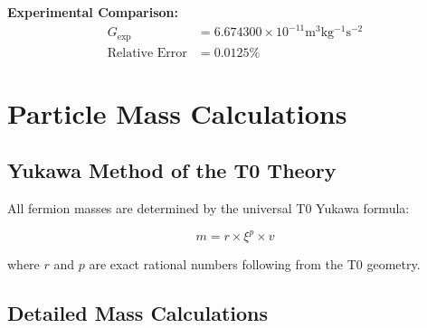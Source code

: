 \documentclass[11pt,a4paper]{article}
\begin{document}
	\textbf{Experimental Comparison:}
	\begin{align}
		G_{\text{exp}} &= 6{.}674300 \times 10^{-11} \si{\meter^3 \kilogram^{-1} \second^{-2}} \\
		\text{Relative Error} &= 0{.}0125\%
	\end{align}
	
	
	\section{Particle Mass Calculations}
	
	\subsection{Yukawa Method of the T0 Theory}
	
	All fermion masses are determined by the universal T0 Yukawa formula:
	
	\begin{equation}
		\boxed{m = r \times \xi^p \times v}
	\end{equation}
	
	where $r$ and $p$ are exact rational numbers following from the T0 geometry.
	
	\subsection{Detailed Mass Calculations}
	
\end{document}

